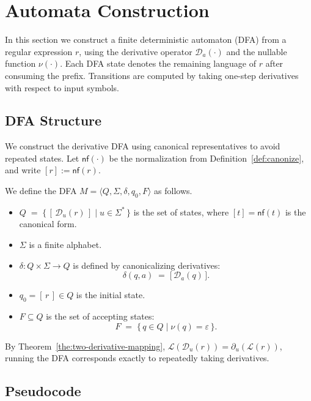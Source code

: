\section{Automata Construction}\label{sec:dfa-from-derivatives}

In this section we construct a finite deterministic automaton (DFA) from a regular expression $r$, using the derivative operator $\mathcal{D}_a(\cdot)$
and the nullable function $\nu(\cdot)$. Each DFA state denotes the remaining
language of $r$ after consuming the prefix. Transitions are computed by taking one-step
derivatives with respect to input symbols.

\subsection{DFA Structure}
We construct the derivative DFA using canonical representatives to avoid repeated states.
Let $\mathsf{nf}(\cdot)$ be the normalization from Definition~\ref{def:canonize},
and write $[r] := \mathsf{nf}(r)$.

We define the DFA $M=\langle Q, \Sigma, \delta, q_0, F\rangle$ as follows.

\begin{itemize}
  \item $Q \;=\; \{\, [\,\mathcal{D}_u(r)\,] \mid u \in \Sigma^* \,\}$ is the set of states,
        where $[t]=\mathsf{nf}(t)$ is the canonical form.

  \item $\Sigma$ is a finite alphabet.

  \item $\delta: Q \times \Sigma \to Q$ is defined by canonicalizing derivatives:
        \[
          \delta(q,a) \;=\; \bigl[\,\mathcal{D}_a(q)\,\bigr].
        \]

  \item $q_0 = [\,r\,] \in Q$ is the initial state.

  \item $F \subseteq Q$ is the set of accepting states:
        \[
          F \;=\; \{\, q \in Q \mid \nu(q)=\varepsilon \,\}.
        \]
\end{itemize}



By Theorem~\ref{the:two-derivative-mapping},
$\mathcal{L}(\mathcal{D}_u(r))=\partial_u(\mathcal{L}(r))$, running the DFA corresponds exactly to repeatedly taking derivatives.


\subsection{Pseudocode}\label{subsec:pseudocode-deriv-dfa}


